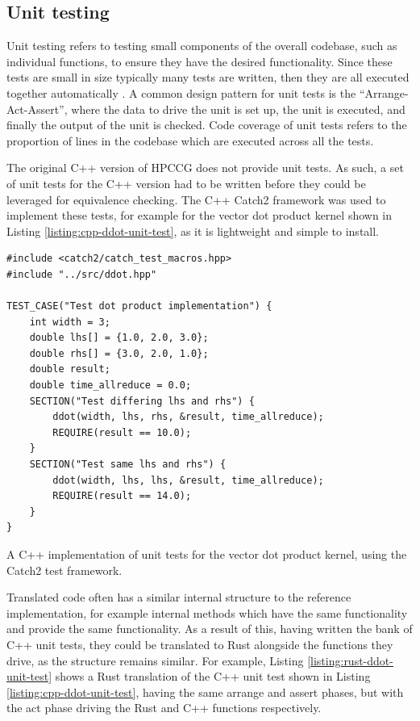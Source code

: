 \subsection{Unit testing}
\label{sec:equivalence-unit-testing}

Unit testing refers to testing small components of the overall codebase, such as individual functions, to ensure they have the desired functionality. Since these tests are small in size typically many tests are written, then they are all executed together automatically \cite{archiveddocsTestEarlyOften2012}. A common design pattern for unit tests is the ``Arrange-Act-Assert'', where the data to drive the unit is set up, the unit is executed, and finally the output of the unit is checked. Code coverage of unit tests refers to the proportion of lines in the codebase which are executed across all the tests.

The original C++ version of HPCCG does not provide unit tests. As such, a set of unit tests for the C++ version had to be written before they could be leveraged for equivalence checking. The C++ Catch2 \cite{CatchorgCatch22024} framework was used to implement these tests, for example for the vector dot product kernel shown in Listing \ref{listing:cpp-ddot-unit-test}, as it is lightweight and simple to install.

\begin{listing}[H]
    \begin{verbatim}
#include <catch2/catch_test_macros.hpp>
#include "../src/ddot.hpp"

TEST_CASE("Test dot product implementation") {
    int width = 3;
    double lhs[] = {1.0, 2.0, 3.0};
    double rhs[] = {3.0, 2.0, 1.0};
    double result;
    double time_allreduce = 0.0;
    SECTION("Test differing lhs and rhs") {
        ddot(width, lhs, rhs, &result, time_allreduce);
        REQUIRE(result == 10.0);
    }
    SECTION("Test same lhs and rhs") {
        ddot(width, lhs, lhs, &result, time_allreduce);
        REQUIRE(result == 14.0);
    }
}
    \end{verbatim}
    \caption{A C++ implementation of unit tests for the vector dot product kernel, using the Catch2 test framework.}
    \label{listing:cpp-ddot-unit-test}
\end{listing}

Translated code often has a similar internal structure to the reference implementation, for example internal methods which have the same functionality and provide the same functionality. As a result of this, having written the bank of C++ unit tests, they could be translated to Rust alongside the functions they drive, as the structure remains similar. For example, Listing \ref{listing:rust-ddot-unit-test} shows a Rust translation of the C++ unit test shown in Listing \ref{listing:cpp-ddot-unit-test}, having the same arrange and assert phases, but with the act phase driving the Rust and C++ functions respectively.

